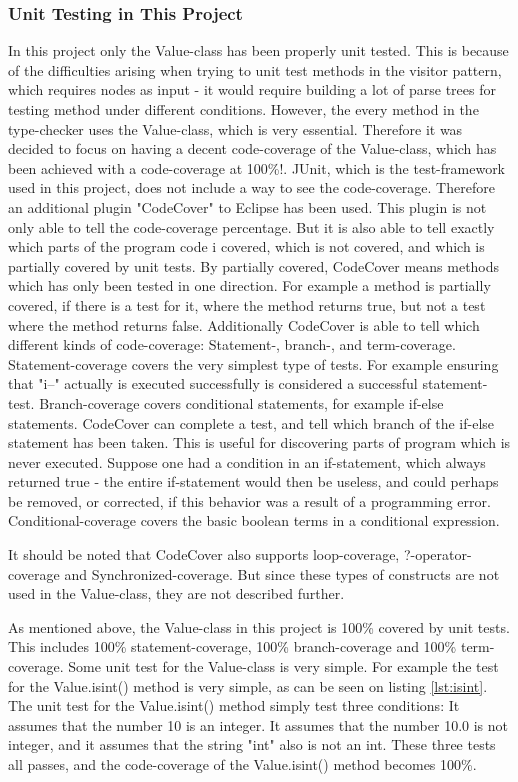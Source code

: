 \subsubsection{Unit Testing in This Project}
In this project only the Value-class has been properly unit tested. This is because of the difficulties arising when trying to unit test methods in the visitor pattern, which requires nodes as input - it would require building a lot of parse trees for testing method under different conditions. However, the every method in the type-checker uses the Value-class, which is very essential. Therefore it was decided to focus on having a decent code-coverage of the Value-class, which has been achieved with a code-coverage at 100\%!. JUnit, which is the test-framework used in this project, does not include a way to see the code-coverage. Therefore an additional plugin "CodeCover" \citep{codecover} to Eclipse has been used. This plugin is not only able to tell the code-coverage percentage. But it is also able to tell exactly which parts of the program code i covered, which is not covered, and which is partially covered by unit tests. By partially covered, CodeCover means methods which has only been tested in one direction. For example a method is partially covered, if there is a test for it, where the method returns true, but not a test where the method returns false. Additionally CodeCover is able to tell which different kinds of code-coverage: Statement-, branch-, and term-coverage. Statement-coverage covers the very simplest type of tests. For example ensuring that "i--" actually is executed successfully is considered a successful statement-test.
Branch-coverage covers conditional statements, for example if-else statements. CodeCover can complete a test, and tell which branch of the if-else statement has been taken. This is useful for discovering parts of program which is never executed. Suppose one had a condition in an if-statement, which always returned true - the entire if-statement would then be useless, and could perhaps be removed, or corrected, if this behavior was a result of a programming error. 
Conditional-coverage covers the basic boolean terms in a conditional expression. 

It should be noted that CodeCover also supports loop-coverage, ?-operator-coverage and Synchronized-coverage. But since these types of constructs are not used in the Value-class, they are not described further. 

As mentioned above, the Value-class in this project is 100\% covered by unit tests. This includes 100\% statement-coverage, 100\% branch-coverage and 100\% term-coverage. Some unit test for the Value-class is very simple. For example the test for the Value.isint() method is very simple, as can be seen on listing \ref{lst:isint}. The unit test for the Value.isint() method simply test three conditions: It assumes that the number 10 is an integer. It assumes that the number 10.0 is not integer, and it assumes that the string "int" also is not an int. These three tests all passes, and the code-coverage of the Value.isint() method becomes 100\%. 

